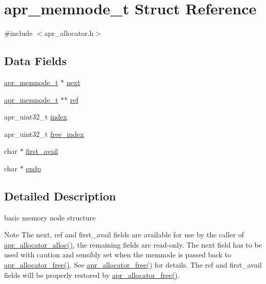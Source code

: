 \hypertarget{structapr__memnode__t}{}\section{apr\+\_\+memnode\+\_\+t Struct Reference}
\label{structapr__memnode__t}


{\ttfamily \#include $<$apr\+\_\+allocator.\+h$>$}

\subsection*{Data Fields}
\begin{DoxyCompactItemize}
\item 
\hyperlink{structapr__memnode__t}{apr\+\_\+memnode\+\_\+t} $\ast$ \hyperlink{structapr__memnode__t_a07dd84ca152164d6bc283dbce99f8f78}{next}
\item 
\hyperlink{structapr__memnode__t}{apr\+\_\+memnode\+\_\+t} $\ast$$\ast$ \hyperlink{structapr__memnode__t_ac68a939c0c3d48498ec0c0fde409c502}{ref}
\item 
apr\+\_\+uint32\+\_\+t \hyperlink{structapr__memnode__t_a6188325f9e1cbcafcb0a65b7e41881a1}{index}
\item 
apr\+\_\+uint32\+\_\+t \hyperlink{structapr__memnode__t_af63769f30f6eb9d72e4b24050bd7a9d9}{free\+\_\+index}
\item 
char $\ast$ \hyperlink{structapr__memnode__t_a863e7980225e46678881271c4c803e4c}{first\+\_\+avail}
\item 
char $\ast$ \hyperlink{structapr__memnode__t_a35c9bf71f1cc680929f857176b547a05}{endp}
\end{DoxyCompactItemize}


\subsection{Detailed Description}
basic memory node structure \begin{DoxyNote}{Note}
The next, ref and first\+\_\+avail fields are available for use by the caller of \hyperlink{group__apr__allocator_ga7452b0837c2148bd63109f89bbc0c3db}{apr\+\_\+allocator\+\_\+alloc()}, the remaining fields are read-\/only. The next field has to be used with caution and sensibly set when the memnode is passed back to \hyperlink{group__apr__allocator_ga124e48339838213fd5e160a4125cb7e8}{apr\+\_\+allocator\+\_\+free()}. See \hyperlink{group__apr__allocator_ga124e48339838213fd5e160a4125cb7e8}{apr\+\_\+allocator\+\_\+free()} for details. The ref and first\+\_\+avail fields will be properly restored by \hyperlink{group__apr__allocator_ga124e48339838213fd5e160a4125cb7e8}{apr\+\_\+allocator\+\_\+free()}. 
\end{DoxyNote}


